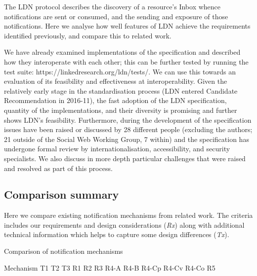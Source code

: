 \documentclass[a4paper]{llncs}
\begin{document}
\par The LDN protocol describes the discovery of a resource’s Inbox whence notifications are sent or consumed, and the sending and exposure of those notifications. Here we analyse how well features of LDN achieve the \empty requirements identified previously, and compare this to related work.


\par We have already examined \empty implementations of the specification and described how they interoperate with each other; this can be further tested by running the \empty test suite: https://linkedresearch.org/ldn/tests/. We can use this towards an evaluation of its feasibility and effectiveness at interoperability. Given the relatively early stage in the standardisation process (LDN entered Candidate Recommendation in 2016-11), the fast adoption of the LDN specification, quantity of the implementations, and their diversity is promising and further shows LDN’s feasibility. Furthermore, during the development of the specification issues have been raised or discussed by 28 different people (excluding the authors; 21 outside of the Social Web Working Group, 7 within) and the specification has undergone formal review by internationalisation, accessibility, and security specialists. We also discuss in more depth particular challenges that were raised and resolved as part of this process.


                                \subsection{Comparison summary}
  \label{comparison-summary}



\par Here we compare existing notification mechanisms from related work. The criteria includes our \empty requirements and design considerations ({\em Rx}) along with additional technical information which helps to capture some design differences ({\em Tx}).


                                        Comparison of notification mechanisms


                                                Mechanism
                                                T1
                                                T2
                                                T3
                                                R1
                                                R2
                                                R3
                                                R4-A
                                                R4-B
                                                R4-Cp
                                                R4-Cv
                                                R4-Co
                                                R5
\end{document}
